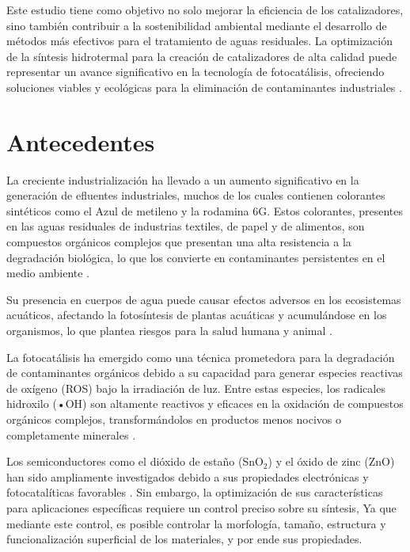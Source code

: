 \documentclass[12pt]{article}
\begin{document}
Este estudio tiene como objetivo no solo mejorar la eficiencia de los catalizadores, sino también contribuir a la sostenibilidad ambiental mediante el desarrollo de métodos más efectivos para el tratamiento de aguas residuales. La optimización de la síntesis hidrotermal para la creación de catalizadores de alta calidad puede representar un avance significativo en la tecnología de fotocatálisis, ofreciendo soluciones viables y ecológicas para la eliminación de contaminantes industriales \cite{IEEEreferencias:Ref12}.

\newpage
\section{Antecedentes}

La creciente industrialización ha llevado a un aumento significativo en la generación de efluentes industriales, muchos de los cuales contienen colorantes sintéticos como el Azul de metileno y la rodamina 6G. Estos colorantes, presentes en las aguas residuales de industrias textiles, de papel y de alimentos, son compuestos orgánicos complejos que presentan una alta resistencia a la degradación biológica, lo que los convierte en contaminantes persistentes en el medio ambiente \cite{IEEEreferencias:Ref10}.
\vspace{1em} %

Su presencia en cuerpos de agua puede causar efectos adversos en los ecosistemas acuáticos, afectando la fotosíntesis de plantas acuáticas y acumulándose en los organismos, lo que plantea riesgos para la salud humana y animal \cite{IEEEreferencias:Ref11}.
\vspace{1em} %

La fotocatálisis ha emergido como una técnica prometedora para la degradación de contaminantes orgánicos debido a su capacidad para generar especies reactivas de oxígeno (ROS) bajo la irradiación de luz. Entre estas especies, los radicales hidroxilo (•OH) son altamente reactivos y eficaces en la oxidación de compuestos orgánicos complejos, transformándolos en productos menos nocivos o completamente minerales \cite{IEEEreferencias:Ref12}. 
\vspace{1em} %

Los semiconductores como el dióxido de estaño (SnO$\displaystyle _{2}$) y el óxido de zinc (ZnO) han sido ampliamente investigados debido a sus propiedades electrónicas y fotocatalíticas favorables \cite{IEEEreferencias:Wang}. Sin embargo, la optimización de sus características para aplicaciones específicas requiere un control preciso sobre su síntesis, Ya que mediante este control, es posible controlar la morfología, tamaño, estructura y funcionalización superficial de los materiales, y por ende sus propiedades.\vspace{1em} %
\end{document}
